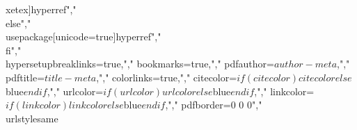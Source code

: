 xetex]{hyperref}","\\else","  \\usepackage[unicode=true]{hyperref}","\\fi","\\hypersetup{breaklinks=true,","            bookmarks=true,","            pdfauthor={$author-meta$},","            pdftitle={$title-meta$},","            colorlinks=true,","            citecolor=$if(citecolor)$$citecolor$$else$blue$endif$,","            urlcolor=$if(urlcolor)$$urlcolor$$else$blue$endif$,","            linkcolor=$if(linkcolor)$$linkcolor$$else$blue$endif$,","            pdfborder={0 0 0}}","\\urlstyle{same}  %